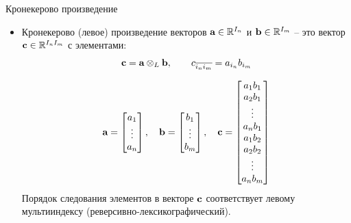 \begin{frame}{Кронекерово произведение}


\begin{itemize}
    \item Кронекерово (левое) произведение векторов $\textbf{a} \in \mathbb{R}^{I_n}$ и $\textbf{b} \in  \mathbb{R}^{I_m}$ -- это вектор $\textbf{c}  \in \mathbb{R}^{I_n I_m}$ с элементами:
    $$\textbf{c} = \textbf{a} \otimes_L \textbf{b}, \quad \quad c_{\overline{i_n i_m}} = a_{i_n}b_{i_m}$$

    $$ \textbf{a} = 
    \begin{bmatrix}
    a_1 \\
    \vdots \\
    a_n 
    \end{bmatrix}, \quad 
    \textbf{b} = 
    \begin{bmatrix}
    b_1 \\
    \vdots \\
    b_m 
    \end{bmatrix}, \quad
    \textbf{c} = 
    \begin{bmatrix}
    a_1 b_1 \\
    a_2 b_1 \\
    \vdots \\
    a_n b_1 \\
    a_1 b_2 \\
    a_2 b_2 \\
    \vdots \\
    a_n b_m 
    \end{bmatrix}
    $$
    Порядок следования элементов в векторе $\textbf{c}$ соответствует левому мультииндексу (реверсивно-лексикографический).
\end{itemize}

\end{frame}


